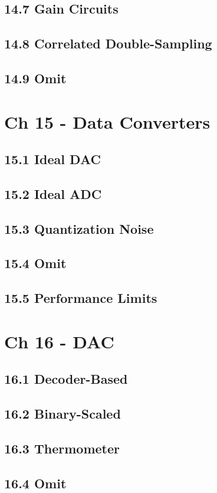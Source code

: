 \documentclass[a4paper,twocolumn]{article}
\begin{document}
    \subsection{14.7 Gain Circuits}
    \subsection{14.8 Correlated Double-Sampling}
    \subsection{14.9 Omit}
  \section{Ch 15 - Data Converters}
    \subsection{15.1 Ideal DAC}
    \subsection{15.2 Ideal ADC}
    \subsection{15.3 Quantization Noise}
    \subsection{15.4 Omit}
    \subsection{15.5 Performance Limits}
  \section{Ch 16 - DAC}
    \subsection{16.1 Decoder-Based}
    \subsection{16.2 Binary-Scaled}
    \subsection{16.3 Thermometer}
    \subsection{16.4 Omit}
\end{document}
